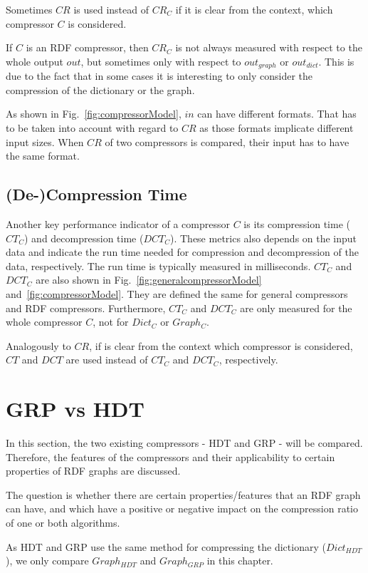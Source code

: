 Sometimes $CR$ is used instead of $CR_C$ if it is clear from the context, which compressor $C$ is considered.

If $C$ is an RDF compressor, then $CR_C$ is not always measured with respect to the whole output $out$, but sometimes only with respect to $out_{graph} \text{ or } out_{dict}$. This is due to the fact that in some cases it is interesting to only consider the compression of the dictionary or the graph.

As shown in Fig.~\ref{fig:compressorModel}, $in$ can have different formats. That has to be taken into account with regard to $CR$ as those formats implicate different input sizes. When $CR$ of two compressors is compared, their input has to have the same format.

\subsection{(De-)Compression Time}

Another key performance indicator of a compressor $C$ is its compression time ($CT_C$) and decompression time ($DCT_C$). These metrics also depends on the input data and indicate the run time needed for compression and decompression of the data, respectively. The run time is typically measured in milliseconds. $CT_C$ and $DCT_C$ are also shown in Fig.~\ref{fig:generalcompressorModel} and~\ref{fig:compressorModel}. They are defined the same for general compressors and RDF compressors. Furthermore, $CT_C$ and $DCT_C$ are only measured for the whole compressor $C$, not for $Dict_C$ or $Graph_C$.

Analogously to $CR$, if is clear from the context which compressor is considered, $CT$ and $DCT$ are used instead of $CT_C$ and $DCT_C$, respectively.


\section{GRP vs HDT}\label{sec:approachGRPvsHDT}

In this section, the two existing compressors - HDT and GRP - will be compared. Therefore, the features of the compressors and their applicability to certain properties of RDF graphs are discussed.

The question is whether there are certain properties/features that an RDF graph can have, and which have a positive or negative impact on the compression ratio of one or both algorithms. 

As HDT and GRP use the same method for compressing the dictionary ($Dict_{HDT}$), we only compare $Graph_{HDT}$ and $Graph_{GRP}$ in this chapter.


